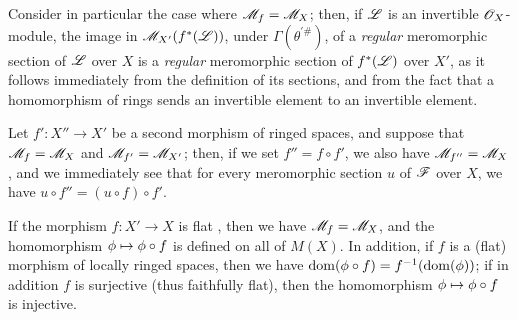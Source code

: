 \begin{env}[20.1.11]
Consider in particular the case where $\mathscr{M}_f=\mathscr{M}_X$;
then, if $\mathscr{L}$ is an invertible $\mathscr{O}_X$-module, the image in $\mathscr{M}_{X'}(f^*(\mathscr{L}))$, under $\Gamma(\theta^{\prime\#})$, of a \emph{regular} meromorphic section of $\mathscr{L}$ over $X$  is a \emph{regular} meromorphic section of $f^*(\mathscr{L})$ over $X'$, as it follows immediately from the definition of its sections, and from the fact that a homomorphism of rings sends an invertible element to an invertible element.

Let $f':X''\to X'$ be a second morphism of ringed spaces, and suppose that $\mathscr{M}_f=\mathscr{M}_X$ and $\mathscr{M}_{f'}=\mathscr{M}_{X'}$;
then, if we set $f''=f\circ f'$, we also have $\mathscr{M}_{f''}=\mathscr{M}_X$, and we immediately see that for every meromorphic section $u$ of $\mathscr{F}$ over $X$, we have $u\circ f''=(u\circ f)\circ f'$.
\end{env}

\begin{proposition}[20.1.12]
\label{IV.20.1.12}
If the morphism $f:X'\to X$ is flat , then we have $\mathscr{M}_f=\mathscr{M}_X$, and the homomorphism $\vphi\mapsto\vphi\circ f$ is defined on all of $M(X)$.
In addition, if $f$ is a (flat) morphism of locally ringed spaces, then we have $\operatorname{dom}(\phi\circ f)=f^{-1}(\operatorname{dom}(\phi))$;
if in addition $f$ is surjective (thus faithfully flat), then the homomorphism $\vphi\mapsto\vphi\circ f$ is injective.
\end{proposition}

